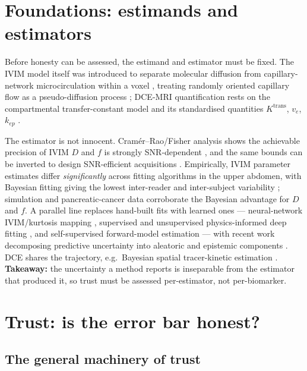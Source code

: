 \documentclass{iopjournal}
\newcommand{\Ktrans}{K^{\mathrm{trans}}}
\begin{document}
\section{Foundations: estimands and estimators}
\label{sec:foundations}

Before honesty can be assessed, the estimand and estimator must be fixed. The IVIM model
itself was introduced to separate molecular diffusion from capillary-network
microcirculation within a voxel \cite{lebihan1986,lebihan1988}, treating randomly
oriented capillary flow as a pseudo-diffusion process \cite{lebihan2019}; DCE-MRI
quantification rests on the compartmental transfer-constant model \cite{tofts1991} and
its standardised quantities $\Ktrans$, $v_e$, $k_{ep}$ \cite{tofts1999}.

The estimator is not innocent. Cram\'er--Rao/Fisher analysis shows the achievable
precision of IVIM $D$ and $f$ is strongly SNR-dependent \cite{zhang2013}, and the same
bounds can be inverted to design SNR-efficient acquisitions \cite{jalnefjord2019}.
Empirically, IVIM parameter estimates differ \emph{significantly} across fitting
algorithms in the upper abdomen, with Bayesian fitting giving the lowest inter-reader
and inter-subject variability \cite{barbieri2016}; simulation \cite{while2017} and
pancreatic-cancer data \cite{gurneychampion2018} corroborate the Bayesian advantage for
$D$ and $f$. A parallel line replaces hand-built fits with learned ones ---
neural-network IVIM/kurtosis mapping \cite{bertleff2017}, supervised and unsupervised
physics-informed deep fitting \cite{barbieri2020,kaandorp2021}, and self-supervised
forward-model estimation \cite{vasylechko2021} --- with recent work decomposing
predictive uncertainty into aleatoric and epistemic components \cite{casali2025}. DCE
shares the trajectory, e.g.\ Bayesian spatial tracer-kinetic estimation
\cite{schmid2006}. \textbf{Takeaway:} the uncertainty a method reports is inseparable
from the estimator that produced it, so trust must be assessed per-estimator, not
per-biomarker.

\section{Trust: is the error bar honest?}
\label{sec:trust}

\subsection{The general machinery of trust}
\label{sec:trust-machinery}
\end{document}
